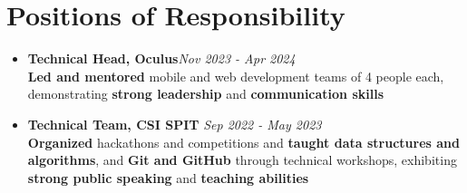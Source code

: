 \section{Positions of Responsibility}
\begin{itemize}

    \item \textbf{Technical Head, Oculus}\hfill \textit{Nov 2023 - Apr 2024} \\  
    \textbf{Led and mentored} mobile and web development teams of 4 people each, demonstrating \textbf{strong leadership} and \textbf{communication skills}
    
    \item \textbf{Technical Team, CSI SPIT}  \hfill \textit{Sep 2022 - May 2023} \\ 
    \textbf{Organized} hackathons and competitions and \textbf{taught  data structures and algorithms}, and \textbf{Git and GitHub} through technical workshops, exhibiting \textbf{strong public speaking} and \textbf{teaching abilities}
    
\end{itemize} 
